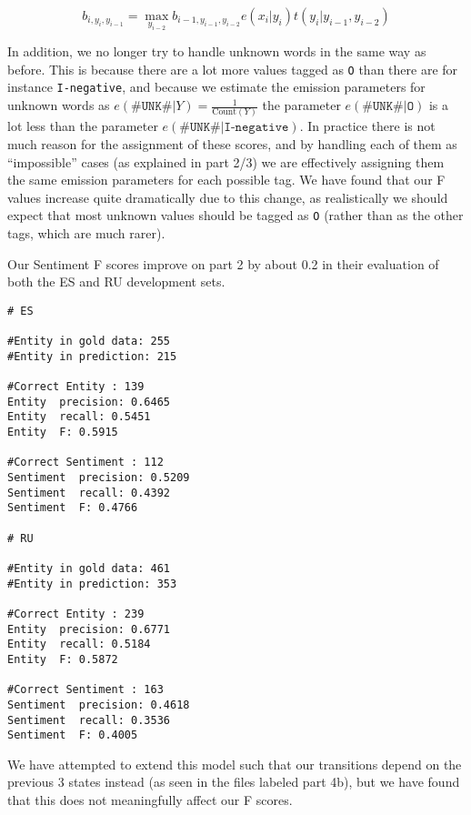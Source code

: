 \documentclass[
]{article}
\begin{document}
\[
b_{i, y_i, y_{i-1}} = \max_{y_{i-2}} b_{i-1, y_{i-1}, y_{i-2}} e(x_i | y_i) t(y_i | y_{i-1}, y_{i-2})
\]

In addition, we no longer try to handle unknown words in the same way as
before. This is because there are a lot more values tagged as \texttt{O}
than there are for instance \texttt{I-negative}, and because we estimate
the emission parameters for unknown words as
$e(\texttt{\#UNK\#} | Y) = \frac{1}{\text{Count}(Y)}$ the parameter
$e(\texttt{\#UNK\#} | \texttt{O})$ is a lot less than the parameter
$e(\texttt{\#UNK\#} | \texttt{I-negative})$. In practice there is not
much reason for the assignment of these scores, and by handling each of
them as ``impossible'' cases (as explained in part 2/3) we are
effectively assigning them the same emission parameters for each
possible tag. We have found that our F values increase quite
dramatically due to this change, as realistically we should expect that
most unknown values should be tagged as \texttt{O} (rather than as the
other tags, which are much rarer).

Our Sentiment F scores improve on part 2 by about 0.2 in their
evaluation of both the ES and RU development sets.

\begin{verbatim}
# ES

#Entity in gold data: 255
#Entity in prediction: 215

#Correct Entity : 139
Entity  precision: 0.6465
Entity  recall: 0.5451
Entity  F: 0.5915

#Correct Sentiment : 112
Sentiment  precision: 0.5209
Sentiment  recall: 0.4392
Sentiment  F: 0.4766

# RU

#Entity in gold data: 461
#Entity in prediction: 353

#Correct Entity : 239
Entity  precision: 0.6771
Entity  recall: 0.5184
Entity  F: 0.5872

#Correct Sentiment : 163
Sentiment  precision: 0.4618
Sentiment  recall: 0.3536
Sentiment  F: 0.4005
\end{verbatim}

We have attempted to extend this model such that our transitions depend
on the previous 3 states instead (as seen in the files labeled part 4b),
but we have found that this does not meaningfully affect our F scores.
\end{document}
